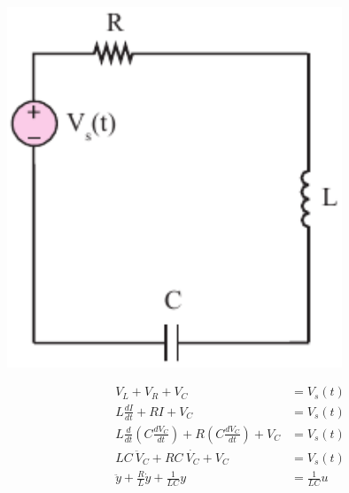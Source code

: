 \documentclass[twoside]{article}
\begin{document}
  \begin{minipage}[h]{0.5\linewidth}
    \begin{center}
      \includegraphics[width=0.75\textwidth]{RLC}
    \end{center}
  \end{minipage}
  \begin{minipage}[h]{0.5\linewidth}
    \begin{center}
    {\large
  \begin{align*}
  	V_L + V_R + V_C &= V_s(t)
	\\
	L \frac{d I}{dt} + R I + V_C &= V_s(t)
	\\
	L \frac{d }{dt} \left( C \frac{d V_C}{dt} \right) + R  \left( C \frac{d V_C}{dt} \right) + V_C &= V_s(t)
	\\
	LC \ \ddot{V}_C + RC \ \dot{V_C} + V_C &= V_s(t)
	\\
	\ddot{y} + \frac{R}{L} \dot{y} + \frac{1}{LC} y &= \frac{1}{LC} u
  \end{align*}
  }
    \end{center}
  \end{minipage}
\end{document}
